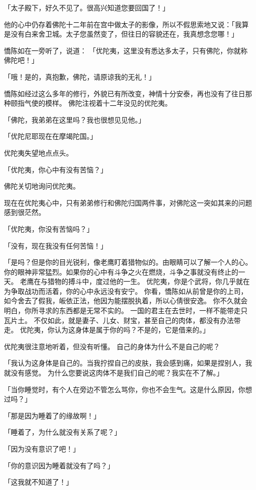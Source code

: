 \documentclass[twoside,openany]{book}
\begin{document}
「太子殿下，好久不见了。很高兴知道您要回国了！」

他的心中仍存着佛陀十二年前在宫中做太子的影像，所以不假思索地又说：「我算是没有白来舍卫城。太子您虽然变了，但往日的容貌还在，我真想念您哪！」

憍陈如在一旁听了，说道：
「优陀夷，这里没有悉达多太子，只有佛陀，你就称佛陀吧！」

「哦！是的，真抱歉，佛陀，请原谅我的无礼！」

憍陈如经过这么多年的修行，外貌已有所改变，神情十分安泰，再也没有了往日那种颐指气使的模样。
佛陀注视着十二年没见的优陀夷。

「佛陀，我弟弟在这里吗？我也很想见见他。」

「优陀尼耶现在在摩竭陀国。」

优陀夷失望地点点头。

「优陀夷，你心中有没有苦恼？」

佛陀关切地询问优陀夷。

现在在优陀夷心中，只有弟弟修行和佛陀归国两件事，对佛陀这一突如其来的问题感到很茫然。

「优陀夷，你没有苦恼吗？」

「没有，现在我没有任何苦恼！」

「是吗？但是你的目光锐利，像老鹰盯着猎物似的。由眼睛可以了解一个人的心。
你的眼神非常猛烈。如果你的心中有斗争之火在燃烧，斗争之事就没有终止的一天。
老鹰在与猎物的搏斗中，度过他的一生。
优陀夷，你是个武将，你几乎就在为争取战功而活着，你的心中永远没有安宁。
你看，憍陈如从前曾是你的上司，如今舍去了假我，皈依正法，他因为能摆脱执着，所以心倩很安逸。
你不久就会明白，你所寻求的东西都是无常不实的。
一国的君主在去世时，一样不能带走只瓦片土。
不仅如此，就是妻子、儿女、财宝，甚至自己的肉体，都没有办法带走。
优陀夷，你认为这身体是属于你的吗？不是的，它是借来的。」

优陀夷很注意地听着，但没有听懂。
自己的身体为什么不是自己的呢？

「我认为这身体是自己的。当我拧捏自己的皮肤，我会感到痛，如果是捏别人，我就没有感觉。
为什么您要说这肉体不是我们自己的呢？我实在不了解。」

「当你睡觉时，有个人在旁边不管怎么骂你，你也不会生气。这是什么原因，你想过吗？」

「那是因为睡着了的缘故啊！」

「睡着了，为什么就没有关系了呢？」

「因为没有意识了吧！」

「你的意识因为睡着就没有了吗？」

「这我就不知道了！」
\end{document}
